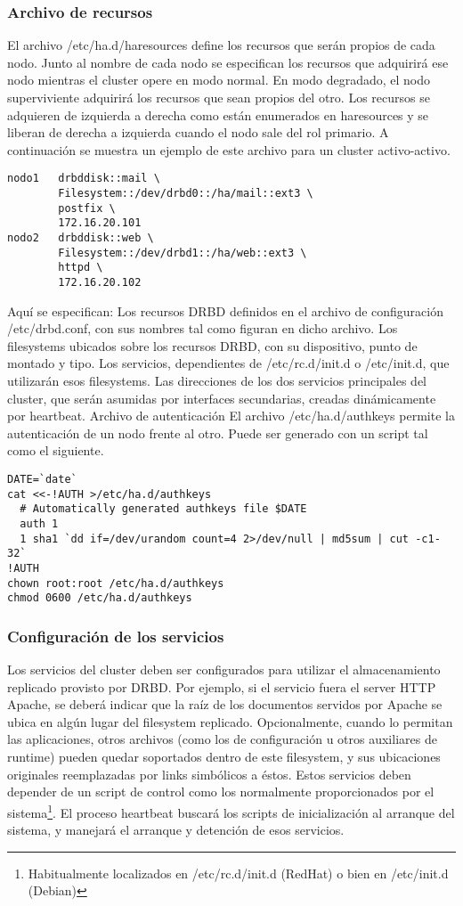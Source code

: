 \subsubsection{Archivo de recursos}
El archivo /etc/ha.d/haresources define los recursos que serán propios de cada nodo. Junto al nombre de cada nodo se especifican los recursos que adquirirá ese nodo mientras el cluster opere en modo normal. En modo degradado, el nodo superviviente adquirirá los recursos que sean propios del otro.
Los recursos se adquieren de izquierda a derecha como están enumerados en haresources y se liberan de derecha a izquierda cuando el nodo sale del rol primario. 
A continuación se muestra un ejemplo de este archivo para un cluster activo-activo.

\begin{lstlisting}
nodo1	drbddisk::mail \
		Filesystem::/dev/drbd0::/ha/mail::ext3 \
		postfix \
		172.16.20.101 
nodo2	drbddisk::web \
		Filesystem::/dev/drbd1::/ha/web::ext3 \
		httpd \
		172.16.20.102
\end{lstlisting}

Aquí se especifican:
Los recursos DRBD definidos en el archivo de configuración /etc/drbd.conf, con sus nombres tal como figuran en dicho archivo.
Los filesystems ubicados sobre los recursos DRBD, con su dispositivo, punto de montado y tipo.
Los servicios, dependientes de /etc/rc.d/init.d o /etc/init.d, que utilizarán esos filesystems.
Las direcciones de los dos servicios principales del cluster, que serán asumidas por interfaces secundarias, creadas dinámicamente por heartbeat.
Archivo de autenticación
El archivo /etc/ha.d/authkeys permite la autenticación de un nodo frente al otro. Puede ser generado con un script tal como el siguiente.

\begin{lstlisting}
DATE=`date`
cat <<-!AUTH >/etc/ha.d/authkeys
  # Automatically generated authkeys file $DATE
  auth 1
  1 sha1 `dd if=/dev/urandom count=4 2>/dev/null | md5sum | cut -c1-32`
!AUTH
chown root:root /etc/ha.d/authkeys
chmod 0600 /etc/ha.d/authkeys
\end{lstlisting}


\subsubsection{Configuración de los servicios}
Los servicios del cluster deben ser configurados para utilizar el almacenamiento replicado provisto por DRBD. Por ejemplo, si el servicio fuera el server HTTP Apache, se deberá indicar que la raíz de los documentos servidos por Apache se ubica en algún lugar del filesystem replicado. Opcionalmente, cuando lo permitan las aplicaciones, otros archivos (como los de configuración u otros auxiliares de runtime) pueden quedar soportados dentro de este filesystem, y sus ubicaciones originales reemplazadas por links simbólicos a éstos.
Estos servicios deben depender de un script de control como los normalmente proporcionados por el sistema\footnote{Habitualmente localizados en /etc/rc.d/init.d (RedHat) o bien en /etc/init.d (Debian)}. El proceso heartbeat buscará los scripts de inicialización al arranque del sistema, y manejará el arranque y detención de esos servicios.


